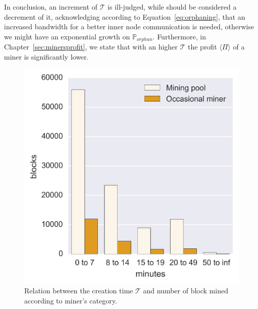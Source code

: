 \documentclass[USenglish]{uit-thesis}
\begin{document}
In conclusion, an increment of $\mathcal{T}$ is ill-judged, while should
be considered a decrement of it, acknowledging according to
Equation~\ref{eq:orphaning}, that an increased bandwidth
for a better inner node communication is needed, otherwise we
might have an exponential growth on $\mathbb{P}_{orphan}$.
Furthermore, in Chapter~\ref{sec:minersprofit}, we state that
with an higher $\mathcal{T}$ the profit $\langle \Pi \rangle$ of
a miner is significantly lower.
\begin{figure}[h]
	\centering
	\includegraphics[width=1\textwidth]{img/creation_time_miners}
	\caption{Relation between the creation time $\mathcal{T}$ and number of block mined according to miner's category.}
	\label{fig:creation_time_miners}
\end{figure}
\end{document}

